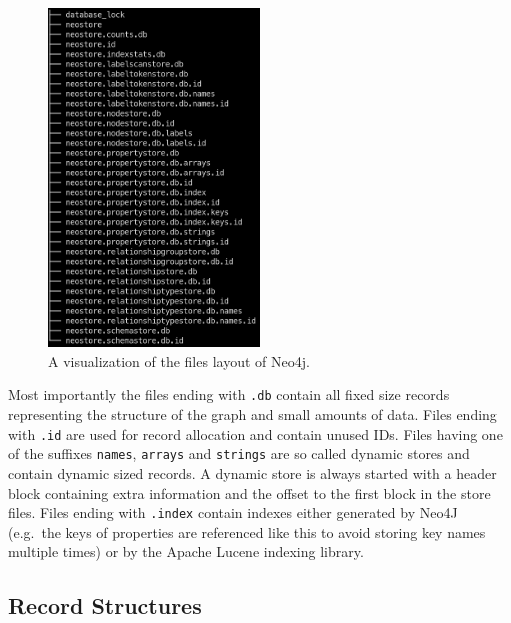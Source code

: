 \documentclass[a4paper,10pt]{article}
\begin{document}
        \begin{figure}[htp]\label{files}
            \begin{center}
                \includegraphics[keepaspectratio,height=0.4\textheight,width=0.5\textwidth]{img/03_record/files.png}
            \end{center}
            \caption{A visualization of the files layout of Neo4j.} %
        \end{figure}

        Most importantly the files ending with \texttt{.db} contain all fixed size records representing the structure of the graph and small amounts of data.
        Files ending with \texttt{.id} are used for record allocation and contain unused IDs. 
        Files having one of the suffixes \texttt{names}, \texttt{arrays} and \texttt{strings} are so called dynamic stores and contain dynamic sized records. 
        A dynamic store is always started with a header block containing extra information and the offset to the first block in the store files. 
        Files ending with \texttt{.index} contain indexes either generated by Neo4J (e.g.\ the keys of properties are referenced like this to avoid storing key names multiple times) or by the Apache Lucene indexing library.
        
    
    \subsection{Record Structures}
\end{document}
